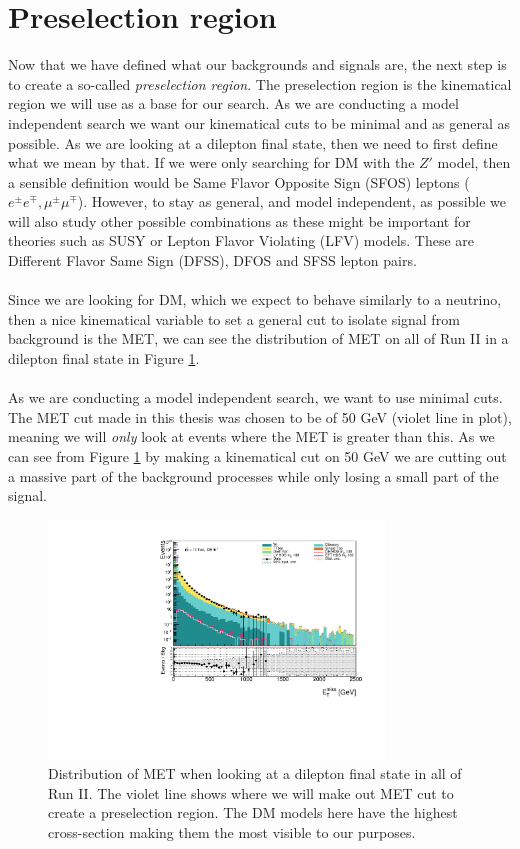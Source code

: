 \documentclass[12pt, a4paper]{book}
\begin{document}
\section{Preselection region}
Now that we have defined what our backgrounds and signals are, the next step is to create a so-called \textit{preselection region}. The preselection region is the kinematical region we will use as a base for our search. As we are conducting a model independent search we want 
our kinematical cuts to be minimal and as general as possible. As we are looking at a dilepton final state, then we need to first define what we mean by that. If we were only searching for DM with the $Z'$ model, then a sensible definition would be 
Same Flavor Opposite Sign (SFOS) leptons ($e^\pm e^\mp, \mu^\pm\mu^\mp$). However, to stay as general, and model independent, as possible we will also study other possible combinations as these might be important for theories such as SUSY or Lepton Flavor Violating 
(LFV) models. These are Different Flavor Same Sign (DFSS), DFOS and SFSS lepton pairs.\\
\\Since we are looking for DM, which we expect to behave similarly to a neutrino, then a nice kinematical variable to set a general cut to isolate signal from background is the MET, we can see the 
distribution of MET on all of Run II in a dilepton final state in Figure \ref{fig:uncut_met}.\\
\\As we are conducting a model independent search, we want to use minimal cuts. The MET cut made in this thesis was chosen to be of 50 GeV (violet line in plot), meaning we will \textit{only} look at events where the MET is greater than this. As we can see from Figure \ref{fig:uncut_met} 
by making a kinematical cut on 50 GeV we are cutting out a massive part of the background processes while only losing a small part of the signal. \\
\graphicspath{{../../../Plots/Data_Analysis/SRs/Uncut/}} 
\begin{figure}[!ht]
    \centering
    \includegraphics[width=0.8\textwidth]{met.pdf}
    \caption[$E_T^{miss}$ distribution in dilepton final state Run II]{Distribution of MET when looking at a dilepton final state in all of Run II. The violet line shows where we will make out MET cut to create a preselection region. The DM models here have the highest cross-section making them the most visible to our purposes.}\label{fig:uncut_met}
\end{figure}
\end{document}
